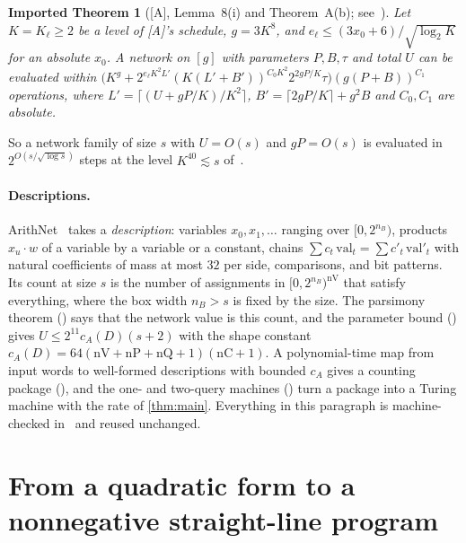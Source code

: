 \documentclass[10pt]{amsart}
\theoremstyle{plain}
\newtheorem{importedtheorem}[theorem]{Imported Theorem}
\theoremstyle{definition}
\theoremstyle{remark}
\numberwithin{equation}{section}
\newcommand{\A}{\textup{[A]}}
\begin{document}
\begin{importedtheorem}[\A, Lemma~8(i) and Theorem~A(b); see~{\cite[Imported Thm.~2.2]{TulFac26}}]\label{imp:engine}
Let $K=K_\ell\ge2$ be a level of \A's schedule, $g=3K^8$, and $e_\ell\le(3x_0+6)/\sqrt{\log_2K}$ for an
absolute $x_0$. A network on $[g]$ with parameters $P,B,\tau$ and total $U$ can be evaluated within
$\bigl(K^g+2^{e_\ell K^2L'}(K(L'+B'))^{C_0K^2}2^{2gP/K}\tau\bigr)(g(P+B))^{C_1}$ operations, where
$L'=\lceil(U+gP/K)/K^2\rceil$, $B'=\lceil2gP/K\rceil+g^2B$ and $C_0,C_1$ are absolute.
\end{importedtheorem}

\noindent So a network family of size $s$ with $U=O(s)$ and $gP=O(s)$ is evaluated in $2^{O(s/\sqrt{\log s})}$ steps
at the level $K^{40}\lesssim s$ of~\cite[\S5]{TulFac26}.

\paragraph{Descriptions.} ArithNet~\cite[\S3]{TulCN26} takes a \emph{description}: variables
$x_0,x_1,\dots$ ranging over $[0,2^{n_B})$, products $x_u\cdot w$ of a variable by a variable or a constant,
chains $\sum c_t\,\mathrm{val}_t=\sum c'_t\,\mathrm{val}'_t$ with natural coefficients of mass at most $32$ per
side, comparisons, and bit patterns. Its count at size $s$ is the number of assignments in
$[0,2^{n_B})^{\mathrm{nV}}$ that satisfy everything, where the box width $n_B>s$ is fixed by the size. The
parsimony theorem () says that the network value is this count, and the parameter
bound () gives $U\le2^{11}c_A(D)(s+2)$ with the shape constant
$c_A(D)=64(\mathrm{nV}+\mathrm{nP}+\mathrm{nQ}+1)(\mathrm{nC}+1)$. A polynomial-time map from input words
to well-formed descriptions with bounded $c_A$ gives a counting package (), and
the one- and two-query machines () turn a package into a Turing machine with the rate
of \cref{thm:main}. Everything in this paragraph is machine-checked in~\cite{TulCN26} and reused unchanged.

\section{From a quadratic form to a nonnegative straight-line program}\label{sec:method}
\end{document}
